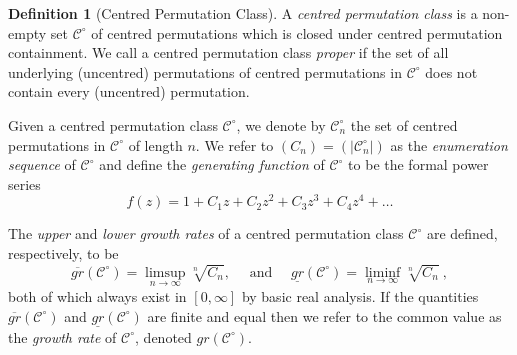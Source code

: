 \documentclass[11pt,a4paper]{article}
\theoremstyle{definition}
\newtheorem{defn}[thm]{Definition}
\newtheorem{comment}[thm]{Comment}
\begin{document}
\begin{defn}[Centred Permutation Class] \label{def:centclass}
A \emph{centred permutation class} is a non-empty set $\mathcal{C}^{\circ}$ of centred permutations which is closed under centred permutation containment. We call a centred permutation class \emph{proper} if the set of all underlying (uncentred) permutations of centred permutations in $\mathcal{C}^{\circ}$ does not contain every (uncentred) permutation.

Given a centred permutation class $\mathcal{C}^{\circ}$, we denote by $\mathcal{C}^{\circ}_{n}$ the set of centred permutations in $\mathcal{C}^{\circ}$ of length $n$. We refer to $(C_{n}) = (|\mathcal{C}^{\circ}_{n}|)$ as the \emph{enumeration sequence} of $\mathcal{C}^{\circ}$ and define the \emph{generating function} of $\mathcal{C}^{\circ}$ to be the formal power series
\begin{equation} \label{lkfjaskz8hjk}
f(z) = 1 + C_{1}z + C_{2}z^{2} + C_{3}z^{3} + C_{4}z^{4} + \dots
\end{equation}

The \emph{upper} and \emph{lower growth rates} of a centred permutation class $\mathcal{C}^{\circ}$ are defined, respectively, to be 
\[
\overline{gr}(\mathcal{C}^{\circ}) = \limsup_{n\to\infty}\sqrt[n]{C_n}, \quad\text{ and }\quad \underline{gr}(\mathcal{C}^{\circ})=\liminf_{n\to\infty}\sqrt[n]{C_n} \ ,
\]
both of which always exist in $[0,\infty]$ by basic real analysis. If the quantities $\overline{gr}(\mathcal{C}^{\circ})$ and $\underline{gr}(\mathcal{C}^{\circ})$ are finite and equal then we refer to the common value as the \emph{growth rate} of $\mathcal{C}^{\circ}$, denoted $gr(\mathcal{C}^{\circ})$.
\end{defn}

\end{document}
